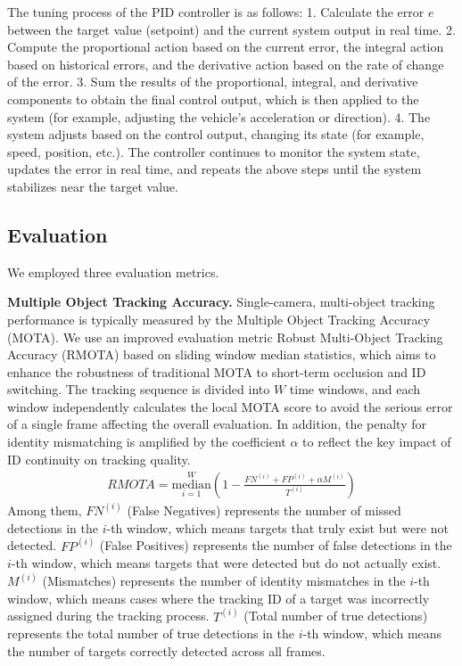 \documentclass[lettersize,journal]{IEEEtran}
\begin{document}
The tuning process of the PID controller is as follows:  
1. Calculate the error \(e\) between the target value (setpoint) and the current system output in real time.  
2. Compute the proportional action based on the current error, the integral action based on historical errors, and the derivative action based on the rate of change of the error.  
3. Sum the results of the proportional, integral, and derivative components to obtain the final control output, which is then applied to the system (for example, adjusting the vehicle's acceleration or direction). 
4. The system adjusts based on the control output, changing its state (for example, speed, position, etc.). 
The controller continues to monitor the system state, updates the error in real time, and repeats the above steps until the system stabilizes near the target value.


\subsection{Evaluation}

We employed three evaluation metrics.

\textbf{Multiple Object Tracking Accuracy.}
Single-camera, multi-object tracking performance is typically measured by the Multiple Object Tracking Accuracy (MOTA)\cite{Alpher23b}.
We use an improved evaluation metric Robust Multi-Object Tracking Accuracy (RMOTA) based on sliding window median statistics, which aims to enhance the robustness of traditional MOTA to short-term occlusion and ID switching.
The tracking sequence is divided into \(W\) time windows, and each window independently calculates the local MOTA score to avoid the serious error of a single frame affecting the overall evaluation.
In addition, the penalty for identity mismatching is amplified by the coefficient \(\alpha\) to reflect the key impact of ID continuity on tracking quality.
\begin{align}
	RMOTA = \underset{i=1}{\overset{W}{\mathrm{median}}} \left(1 - \frac{FN^{(i)} + FP^{(i)} + \alpha M^{(i)}}{T^{(i)}}\right) 
\end{align}
Among them,
\(FN^{(i)}\) (False Negatives) represents the number of missed detections in the \(i\)-th window, which means targets that truly exist but were not detected.
\(FP^{(i)}\) (False Positives) represents the number of false detections in the \(i\)-th window, which means targets that were detected but do not actually exist.
\(M^{(i)}\) (Mismatches) represents the number of identity mismatches in the \(i\)-th window, which means cases where the tracking ID of a target was incorrectly assigned during the tracking process.
\(T^{(i)}\) (Total number of true detections) represents the total number of true detections in the \(i\)-th window, which means the number of targets correctly detected across all frames.
\end{document}
